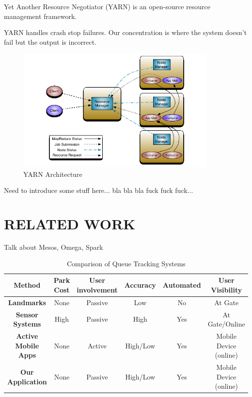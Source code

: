 \documentclass{sig-alternate}
\begin{document}
Yet Another Resource Negotiator (YARN) is an open-source resource management framework.

YARN handles crash stop failures. Our concentration is where the system doesn't fail but the output is incorrect.

\begin{figure}
\centering
\includegraphics[width=10cm]{images/yarn_architecture.png}
\caption{YARN Architecture}
\label{fig:arch}
\end{figure}
Need to introduce some stuff here... bla bla bla fuck fuck fuck...



\section{RELATED WORK}
\label{sec:related}

Talk about Mesos, Omega, Spark




\begin{table}
\centering
\begin{tabular}{|>{\bfseries}c|c|c|c|c|c|} \hline
\textbf{Method}    &    \textbf{Park Cost}    &    \textbf{User involvement}    &    \textbf{Accuracy}    &    \textbf{Automated}    &    \textbf{User Visibility}\\ \hline
Landmarks    &    None    &    Passive    &    Low    &    No    &    At Gate\\ \hline
Sensor Systems    &    High    &    Passive    &    High    &    Yes    &    At Gate/Online\\ \hline
Active Mobile Apps    &    None    &    Active    &    High/Low    &    Yes    &    Mobile Device (online)\\ \hline
Our Application    &    None    &    Passive    &    High/Low    &    Yes    &    Mobile Device (online)\\ \hline
\end{tabular}
\caption{Comparison of Queue Tracking Systems}
\label{tab:related_work}
\end{table}
 
\end{document}
